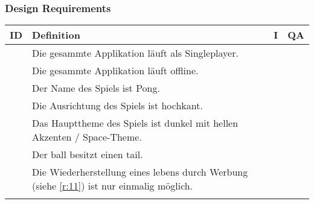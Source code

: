 \subsubsection{Design Requirements}
\renewcommand{\CAT}{D}
\begin{xltabular}{\textwidth}{|l|X|r|r|}
    \hline
    \textbf{ID} & \textbf{Definition}   & \textbf{I}    & \textbf{QA}                                           \\
    \hline

    \setSystem{\ref*{sys:gen}}  %

      & Die gesammte Applikation läuft als Singleplayer.             &      &     \\ \hline
      & Die gesammte Applikation läuft offline.             &      &      \\ \hline
      & Der Name des Spiels ist Pong.             &      &     \\ \hline
      & Die Ausrichtung des Spiels ist hochkant.             &      &     \\ \hline
      & Das Haupttheme des Spiels ist dunkel mit hellen Akzenten / Space-Theme.      &      &     \\ \hline
      & Der \gls{ball} besitzt einen \gls{tail}.             &      &      \\ \hline
      & Die Wiederherstellung eines \glspl{leben} durch Werbung (siehe \ref{r:11}) ist nur einmalig möglich. &   &  \\ \hline

    \setSystem{\ref*{sys:ui}}  %


\end{xltabular}
